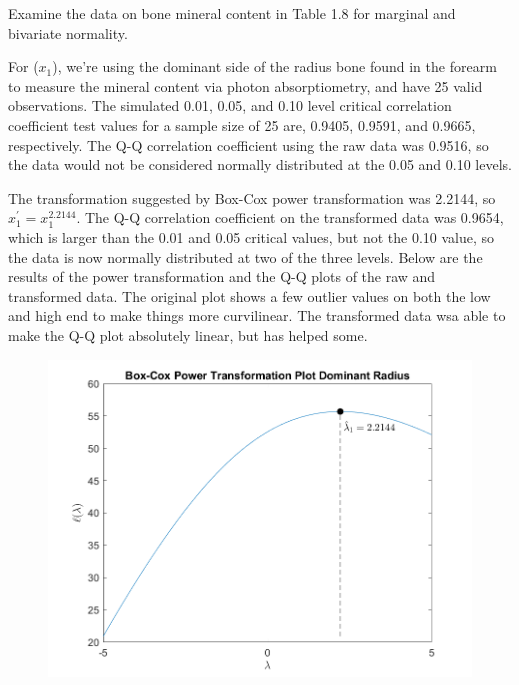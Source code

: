 Examine the data on bone mineral content in Table 1.8 for marginal and bivariate normality.

For ($x_{1}$), we're using the dominant side of the radius bone found in the forearm to measure the mineral content via photon absorptiometry, and have 25 valid observations. The simulated 0.01, 0.05, and 0.10 level critical correlation coefficient test values for a sample size of 25 are, 0.9405, 0.9591, and 0.9665, respectively. The Q-Q correlation coefficient using the raw data was 0.9516, so the data would not be considered normally distributed at the 0.05 and 0.10 levels.

The transformation suggested by Box-Cox power transformation was 2.2144, so $x_{1}^{\prime} = x_{1}^{2.2144}$. The Q-Q correlation coefficient on the transformed data was 0.9654, which is larger than the 0.01 and 0.05 critical values, but not the 0.10 value, so the data is now normally distributed at two of the three levels. Below are the results of the power transformation and the Q-Q plots of the raw and transformed data. The original plot shows a few outlier values on both the low and high end to make things more curvilinear. The transformed data wsa able to make the Q-Q plot absolutely linear, but has helped some.

\begin{center}
    \begin{figure}[H]
        \centering
        \includegraphics[scale=0.6]{./matlab/chapter-4/sol4.34.power.1.png}
    \end{figure}
\end{center}

